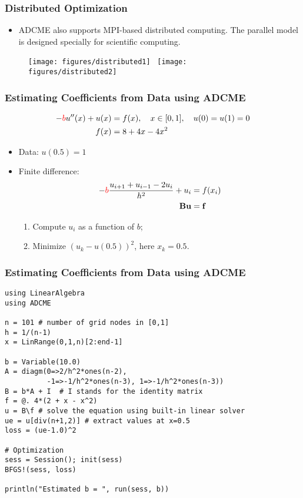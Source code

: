\documentclass[usenames,dvipsnames]{beamer}
\begin{document}
\begin{frame}
	\frametitle{Distributed Optimization}
	\begin{itemize}
		\item ADCME also supports MPI-based distributed computing. The parallel model is designed specially for scientific computing. 
	\end{itemize}
	\begin{figure}[hbt]
		\centering
  \texttt{[image: figures/distributed1]}~
  \texttt{[image: figures/distributed2]}
\end{figure}
\end{frame}

\begin{frame}
	\frametitle{Estimating Coefficients from Data using ADCME}
	
	\begin{align*}
		-\textcolor{red}{b} u''(x) + u(x) &= f(x), \quad x\in [0,1], \quad u(0) = u(1) = 0\\ 
		f(x) &= 8+4x-4x^2
	\end{align*}
	
	
	\begin{itemize}
		\item Data: $u(0.5)=1$
		\item Finite difference:
		\begin{align*}
			-\textcolor{red}{b}\frac{u_{i+1} + u_{i-1} - 2u_i}{h^2} + u_i &= f(x_i)\\
			\mathbf{B} \mathbf{u} &= \mathbf{f}
		\end{align*}
		\begin{enumerate}
			\item Compute $u_i$ as a function of $b$;
			\item Minimize $(u_k - u(0.5))^2$, here $x_k = 0.5$.
		\end{enumerate}
	\end{itemize}
	
\end{frame}

\begin{frame}[fragile]
	\frametitle{Estimating Coefficients from Data using ADCME}
	\vspace{-0.3cm}
	{\small
	\begin{lstlisting}
using LinearAlgebra
using ADCME

n = 101 # number of grid nodes in [0,1]
h = 1/(n-1)
x = LinRange(0,1,n)[2:end-1]

b = Variable(10.0) 
A = diagm(0=>2/h^2*ones(n-2), 
          -1=>-1/h^2*ones(n-3), 1=>-1/h^2*ones(n-3)) 
B = b*A + I  # I stands for the identity matrix
f = @. 4*(2 + x - x^2) 
u = B\f # solve the equation using built-in linear solver
ue = u[div(n+1,2)] # extract values at x=0.5
loss = (ue-1.0)^2 

# Optimization
sess = Session(); init(sess) 
BFGS!(sess, loss)

println("Estimated b = ", run(sess, b))
	\end{lstlisting}
	}
\end{frame}
\end{document}
